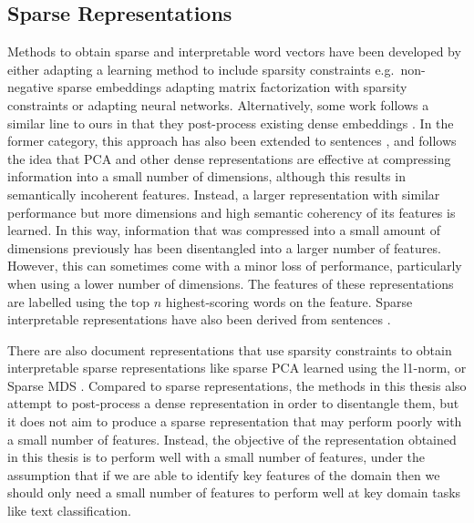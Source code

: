 

\subsection{Sparse Representations}

Methods to obtain sparse and interpretable word vectors have been developed by either adapting a learning method to include sparsity constraints e.g.\  non-negative sparse embeddings adapting matrix factorization with  sparsity constraints \cite{Murphy} or \cite{Luo2015} adapting neural networks. Alternatively, some work follows a similar line to ours in that they post-process existing dense embeddings \cite{Subramanian} \cite{Park2017} \cite{Faruqui2015}. In the former category,  this approach has also been extended to sentences \cite{Trifonov2018}, and follows the idea that PCA and other dense representations are effective at compressing information into a small number of dimensions, although this results in semantically incoherent features. Instead, a larger representation with similar performance but more dimensions and high semantic coherency of its features is learned. In this way, information that was compressed into a small amount of dimensions previously has been disentangled into a larger number of features.  However, this can sometimes come with a minor loss of performance, particularly when using a lower number of dimensions. The features of these representations are labelled using the top $n$ highest-scoring words on the feature. Sparse interpretable representations have also been derived from sentences \cite{Trifonov}.

There are also document representations that use sparsity constraints to obtain interpretable sparse representations like sparse PCA learned using the l1-norm, \cite{H.Zou2006} \cite{Zhang2012} or Sparse MDS \cite{Silva2004}. Compared to sparse representations, the methods in this thesis also attempt to post-process a dense representation in order to disentangle them, but it does not aim to produce a sparse representation that may perform poorly with a small number of features. Instead, the objective of the representation obtained in this thesis is to perform well with a small number of features, under the assumption that if we are able to identify key features of the domain then we should only need a small number of features to perform well at key domain tasks like text classification.  

